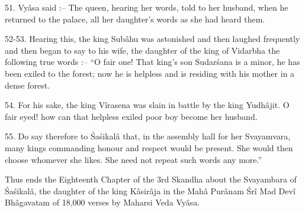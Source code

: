 51. Vy\^asa said :-- The queen, hearing her words, told to her husband, when he returned to the palace, all her daughter's words as she had heard them.

52-53. Hearing this, the king Sub\^ahu was astonished and then laughed frequently and then began to say to his wife, the daughter of the king of Vidarbha the following true words :-- ``O fair one! That king's son Sudar\'sana is a minor, he has been exiled to the forest; now he is helpless and is residing with his mother in a dense forest.

54. For his sake, the king V\^irasena was slain in battle by the king Yudh\^ajit. O fair eyed! how can that helpless exiled poor boy become her husband.

55. Do say therefore to \'Sa\'sikal\^a that, in the assembly hall for her Svayamvara, many kings commanding honour and respect would be present. She would then choose whomever she likes. She need not repeat such words any more.''

Thus ends the Eighteenth Chapter of the 3rd Skandha about the Svayambara of \'Sa\'sikal\^a, the daughter of the king K\^asir\^aja in the Mah\^a Pur\^anam \'Sr\^i Mad Dev\^i Bh\^agavatam of 18,000 verses by Maharsi Veda Vy\^asa.